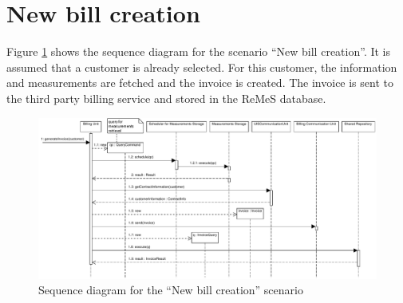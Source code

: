 \section{New bill creation}
\label{scenario:bill-creation}

\npar Figure \ref{fig:scenario-5-13} shows the sequence diagram for the scenario
``New bill creation''. It is assumed that a customer is already selected. For
this customer, the information and measurements are fetched and the invoice is
created. The invoice is sent to the third party billing service and stored in
the ReMeS database.

\begin{figure}[H]
	\begin{centering}
		\includegraphics[width=1.42\textwidth,angle=90]{figs/scenario-5-13.pdf}
		\caption{Sequence diagram for the ``New bill creation'' scenario}
		\label{fig:scenario-5-13}
	\end{centering}
\end{figure}
